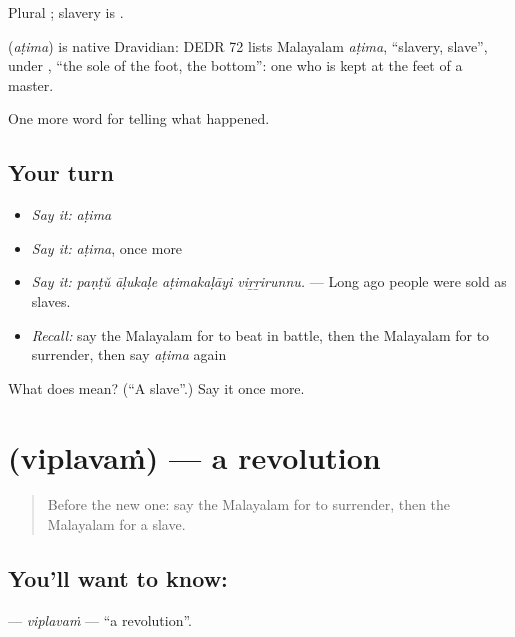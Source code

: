Plural ; slavery is .

\begin{cousinweb}
\textbf{} (\emph{aṭima}) is native Dravidian: DEDR 72 lists Malayalam \emph{aṭima}, \textquotedblleft{}slavery, slave\textquotedblright{}, under , \textquotedblleft{}the sole of the foot, the bottom\textquotedblright{}: one who is kept at the feet of a master.
\end{cousinweb}

\begin{grammarlens}[title={What you've built}]
One more word for telling what happened.
\end{grammarlens}

\subsection*{Your turn}
\begin{itemize}
\raggedright
  \item \emph{Say it:} \emph{aṭima}
  \item \emph{Say it:} \emph{aṭima}, once more
  \item \emph{Say it:} \emph{paṇṭŭ āḷukaḷe aṭimakaḷāyi viṟṟirunnu.} — Long ago people were sold as slaves.
  \item \emph{Recall:} say the Malayalam for to beat in battle, then the Malayalam for to surrender, then say \emph{aṭima} again
\end{itemize}

\begin{tcolorbox}[breakable,colback=teal!4,colframe=teal!35!black,title={Before you move on}]
What does  mean? (\textquotedblleft{}A slave\textquotedblright{}.) Say it once more.
\end{tcolorbox}
\section[\texorpdfstring{\ml{വിപ്ലവം} (viplavaṁ)}{വിപ്ലവം (viplavaṁ)}]{ (viplavaṁ) — a revolution}

\label{lesson:ML-C401-viplavam}



\begin{quote}
Before the new one: say the Malayalam for to surrender, then the Malayalam for a slave.
\end{quote}

\subsection*{You'll want to know: }
\textbf{} — \emph{viplavaṁ} — \textquotedblleft{}a revolution\textquotedblright{}.

